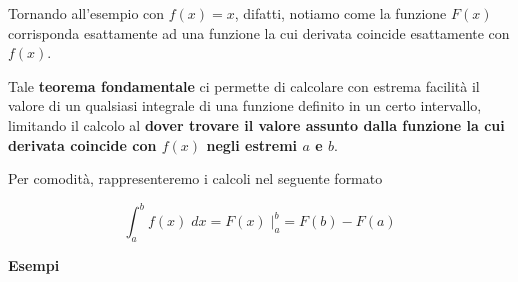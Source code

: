 \documentclass[a4paper, 12pt]{report}
\begin{document}
    Tornando all'esempio con $f(x) = x$, difatti, notiamo come la funzione $F(x)$ corrisponda esattamente ad una funzione la cui derivata coincide esattamente con $f(x)$.
    
    Tale \textbf{teorema fondamentale} ci permette di calcolare con estrema facilità il valore di un qualsiasi integrale di una funzione definito in un certo intervallo, limitando il calcolo al \textbf{dover trovare il valore assunto dalla funzione la cui derivata coincide con $f(x)$ negli estremi $a$ e $b$}.
    
    Per comodità, rappresenteremo i calcoli nel seguente formato
    
    \[ \int_{a}^{b} f(x) \; dx = \left . F(x) \; \right |_{a}^{b} = F(b) - F(a)\]
    
    \newpage
    
    \textbf{Esempi}
    
\end{document}
